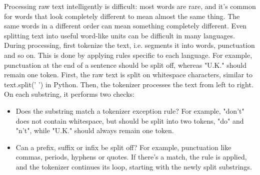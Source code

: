 \documentclass[a4paper,10pt]{article}
\begin{document}
  \quad Processing raw text intelligently is difficult: most words are rare, and it's common for words that look completely different to mean almost the same thing. The same words in a different order can mean something completely different. Even splitting text into useful word-like units can be difficult in many languages.
  \newline During processing, first tokenize the text, i.e. segments it into words, punctuation and so on. This is done by applying rules specific to each language. For example, punctuation at the end of a sentence should be split off, whereas "U.K." should remain one token.
  \newline First, the raw text is split on whitespace characters, similar to text.split(' ') in Python. Then, the tokenizer processes the text from left to right. On each substring, it performs two checks:
   \begin{itemize}
  \item Does the substring match a tokenizer exception rule? For example, "don't" does not contain whitespace, but should be split into two tokens, "do" and "n't", while "U.K." should always remain one token.
  \item Can a prefix, suffix or infix be split off? For example, punctuation like commas, periods, hyphens or quotes.
  If there's a match, the rule is applied, and the tokenizer continues its loop, starting with the newly split substrings.
   \end{itemize}
\end{document}
